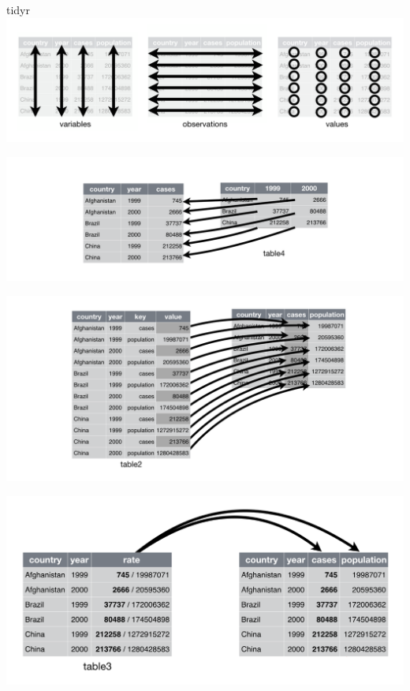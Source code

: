 \documentclass[ignorenonframetext,]{beamer}
\begin{document}
\begin{frame}[fragile]{tidyr}
\includegraphics{tidy-1.png}

\includegraphics{tidy-9.png}

\includegraphics{tidy-8.png}

\includegraphics{tidy-17.png}

\end{frame}
\end{document}
